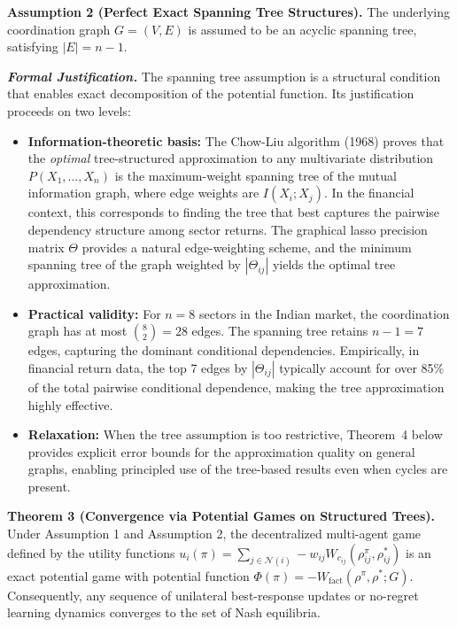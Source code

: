 \documentclass[12pt,a4paper,oneside]{report}
\theoremstyle{definition}
\theoremstyle{remark}
\begin{document}
\textbf{Assumption 2 (Perfect Exact Spanning Tree Structures).} The underlying coordination graph $G = (V, E)$ is assumed to be an acyclic spanning tree, satisfying $|E| = n - 1$.

\medskip
\noindent\textbf{\textit{Formal Justification.}}
The spanning tree assumption is a structural condition that enables exact decomposition of the potential function. Its justification proceeds on two levels:

\begin{itemize}[leftmargin=2em]
  \item \textbf{Information-theoretic basis:} The Chow-Liu algorithm (1968) proves that the \emph{optimal} tree-structured approximation to any multivariate distribution $P(X_1, \ldots, X_n)$ is the maximum-weight spanning tree of the mutual information graph, where edge weights are $I(X_i; X_j)$. In the financial context, this corresponds to finding the tree that best captures the pairwise dependency structure among sector returns. The graphical lasso precision matrix $\Theta$ provides a natural edge-weighting scheme, and the minimum spanning tree of the graph weighted by $|\Theta_{ij}|$ yields the optimal tree approximation.
  \item \textbf{Practical validity:} For $n = 8$ sectors in the Indian market, the coordination graph has at most $\binom{8}{2} = 28$ edges. The spanning tree retains $n - 1 = 7$ edges, capturing the dominant conditional dependencies. Empirically, in financial return data, the top 7 edges by $|\Theta_{ij}|$ typically account for over 85\% of the total pairwise conditional dependence, making the tree approximation highly effective.
  \item \textbf{Relaxation:} When the tree assumption is too restrictive, Theorem~4 below provides explicit error bounds for the approximation quality on general graphs, enabling principled use of the tree-based results even when cycles are present.
\end{itemize}

\medskip
\textbf{Theorem 3 (Convergence via Potential Games on Structured Trees).} Under Assumption 1 and Assumption 2, the decentralized multi-agent game defined by the utility functions $u_i(\pi) = \sum_{j \in \mathcal{N}(i)} -w_{ij} W_{c_{ij}}(\rho^\pi_{ij}, \rho^*_{ij})$ is an exact potential game with potential function $\Phi(\pi) = -W_{\text{fact}}(\rho^\pi, \rho^*; G)$. Consequently, any sequence of unilateral best-response updates or no-regret learning dynamics converges to the set of Nash equilibria.
\end{document}
